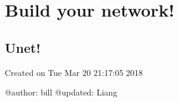 \documentclass[letterpaper,10pt,english]{sphinxmanual}
\begin{document}
\section{Build your network!}
\label{\detokenize{usage/quickstart:build-your-network}}\label{\detokenize{usage/quickstart::doc}}

\subsection{Unet!}
\label{\detokenize{usage/net_file:module-unet}}\label{\detokenize{usage/net_file:unet}}\label{\detokenize{usage/net_file::doc}}
Created on Tue Mar 20 21:17:05 2018

@author: bill
@updated: Liang
\end{document}

